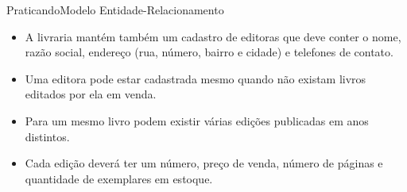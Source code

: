 \documentclass[t]{beamer}
\begin{document}

\begin{ftst}{Praticando}{Modelo Entidade-Relacionamento}


\begin{itemize}
    \item A livraria mantém também um cadastro de editoras que deve conter o nome, razão social, endereço (rua, número, bairro e cidade) e telefones de contato.
    \item Uma editora pode estar cadastrada mesmo quando não existam livros editados por ela em venda.
    \item Para um mesmo livro podem existir várias edições publicadas em anos distintos.
    \item Cada edição deverá ter um número, preço de venda, número de páginas e quantidade de exemplares em estoque.
\end{itemize}

\end{ftst}
\end{document}
